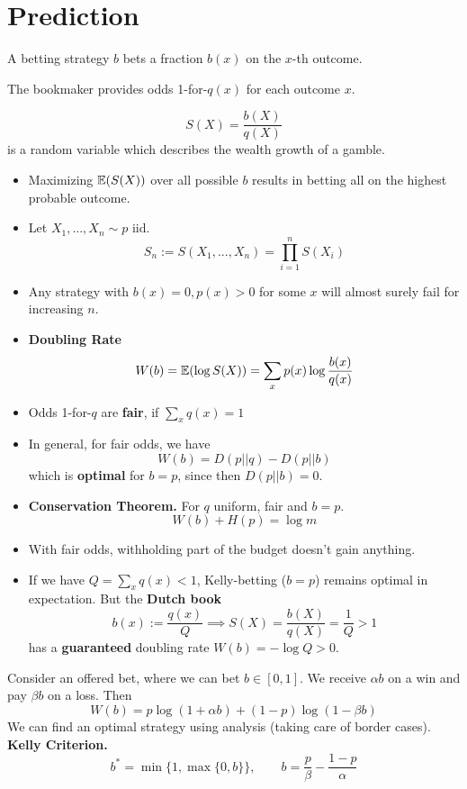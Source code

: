 \section{Prediction}

A betting strategy \(b\) bets a fraction \(b(x)\) on the \(x\)-th outcome.

The bookmaker provides odds 1-for-\(q(x)\) for each outcome \(x\).

\[S(X) = \frac{b(X)}{q(X)}\] is a random variable which describes the wealth growth of a gamble.
\begin{itemize}[label=-]
    \item Maximizing \(\mathbb{E}(S(X))\) over all possible \(b\) results in betting all on the highest probable outcome. 
    \item Let \(X_1,...,X_n \sim p\) iid. \[S_n := S(X_1, ..., X_n) = \prod_{i = 1}^{n}S(X_i)\]
    \item Any strategy with \(b(x) = 0, p(x) > 0\) for some \(x\) will almost surely fail for increasing \(n\).
    \item \textbf{Doubling Rate}
    \[W(b) = \mathbb{E}(\log S(X)) = \sum_{x} p(x) \log \frac{b(x)}{q(x)}\]
    \item Odds 1-for-\(q\) are \textbf{fair}, if \(\sum_{x}q(x) = 1\)
    \item In general, for fair odds, we have \[W(b) = D(p || q) - D(p || b)\]
    which is \textbf{optimal} for \(b = p\), since then \(D(p || b) = 0\).
    \item \textbf{Conservation Theorem.} For \(q\) uniform, fair and \(b = p\). 
    \[W(b) + H(p) = \log m\] 
    \item With fair odds, withholding part of the budget doesn't gain anything.
    \item If we have \(Q = \sum_{x} q(x) < 1\), Kelly-betting (\(b = p\)) remains optimal in expectation. 
    But the \textbf{Dutch book} 
    \[b(x) := \frac{q(x)}{Q} \implies S(X) = \frac{b(X)}{q(X)} = \frac{1}{Q} > 1\]
    has a \textbf{guaranteed} doubling rate \(W(b) = - \log Q > 0\).
\end{itemize}
Consider an offered bet, where we can bet \(b \in [0, 1]\). We receive \(\alpha b\) on a win and pay \(\beta b\) on a loss.
Then \[W(b) = p \log(1 + \alpha b) + (1-p) \log(1- \beta b)\]
We can find an optimal strategy using analysis (taking care of border cases).
\textbf{Kelly Criterion.} 
\[b^* = \min\{1, \max\{0, b\}\}, \qquad b = \frac{p}{\beta} - \frac{1-p}{\alpha}\]



